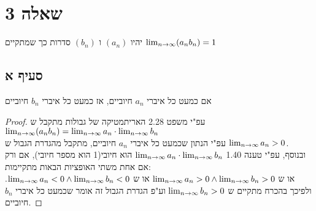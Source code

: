\documentclass{article}
\begin{document}
\pagebreak
\section*{שאלה 3}
יהיו $(a_n)$ ו $(b_n)$ סדרות כך שמתקיים $\lim_{n \to \infty} (a_n b_n) = 1$
\subsection*{סעיף א}
אם כמעט כל איברי $a_n$ חיוביים, אז כמעט כל איברי $b_n$ חיוביים
\begin{proof}
	עפ"י משפט 2.28 האריתמטיקה של גבולות מתקבל ש  \\
	$\lim_{n \to \infty}(a_n b_n) = \lim_{n \to \infty} a_n \cdot \lim_{n \to \infty} b_n$ \\
	עפ"י הנתון שכמעט כל איברי $a_n$ חיוביים, מתקבל מהגדרת הגבול ש $\lim_{n \to \infty} a_n > 0$. \\
ובנוסף, עפ"י טענה 1.40 $\lim_{n \to \infty} a_n \cdot \lim_{n \to \infty} b_n$ הוא חיובי(1 הוא מספר חיובי), אם ורק אם אחת משתי האופציות הבאות מתקיימות: \\
	או ש $\lim_{n \to \infty} a_n > 0 \land \lim_{n \to \infty} b_n > 0$ או ש $\lim_{n \to \infty} a_n < 0 \land \lim_{n \to \infty} b_n < 0$.
	ולפיכך בהכרח מתקיים ש $\lim_{n \to \infty} b_n > 0$ וע"פ הגדרת הגבול זה אומר שכמעט כל איברי $b_n$ חיוביים.
\end{proof}
\end{document}
